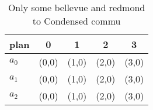 \documentclass[a4paper]{article}
\begin{document}
\begin{table}
\begin{adjustbox}{width=0.6\columnwidth}
\begin{tabular}{|l|l|l|l|l|}
\hline
\textbf{plan} & \multicolumn{1}{c|}{\textbf{0}} & \multicolumn{1}{c|}{\textbf{1}} & \multicolumn{1}{c|}{\textbf{2}} & \multicolumn{1}{c|}{\textbf{3}} \\ \hline
\textbf{$a_0$}  & (0,0) & (1,0) & (2,0) & (3,0) \\ \hline
\textbf{$a_1$}  & (0,0) & (1,0) & (2,0) & (3,0) \\ \hline
\textbf{$a_2$}  & (0,0) & (1,0) & (2,0) & (3,0) \\ \hline
\end{tabular}
\end{adjustbox}
\caption{Only some bellevue and redmond to Condensed commu
}
\end{table}
\end{document}
